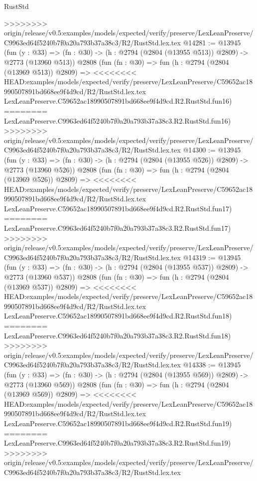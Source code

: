 \begin{lexlean}{RustStd}
\begin{coremodule}
{\begin{coremodule}
{{{{{{{{{{{{{{{{{{{{{{{{{{>>>>>>>> origin/release/v0.5:examples/models/expected/verify/preserve/LexLeanPreserve/C9963ed64f5240b7f0a20a793b37a38c3/R2/RustStd.lex.tex
@14281 := @13945
    (fun (y : @33) => (fn : @30) -> (h : @2794 (@2804 (@13955 @513)) @2809) -> @2773 (@13960 @513))
    @2808
    (fun (fn : @30) =>
    fun (h : @2794 (@2804 (@13969 @513)) @2809) =>
<<<<<<<< HEAD:examples/models/expected/verify/preserve/LexLeanPreserve/C59652ac18990507891bd668ee9f4d9cd/R2/RustStd.lex.tex
    LexLeanPreserve.C59652ac18990507891bd668ee9f4d9cd.R2.RustStd.fun16)
========
    LexLeanPreserve.C9963ed64f5240b7f0a20a793b37a38c3.R2.RustStd.fun16)
>>>>>>>> origin/release/v0.5:examples/models/expected/verify/preserve/LexLeanPreserve/C9963ed64f5240b7f0a20a793b37a38c3/R2/RustStd.lex.tex
@14300 := @13945
    (fun (y : @33) => (fn : @30) -> (h : @2794 (@2804 (@13955 @526)) @2809) -> @2773 (@13960 @526))
    @2808
    (fun (fn : @30) =>
    fun (h : @2794 (@2804 (@13969 @526)) @2809) =>
<<<<<<<< HEAD:examples/models/expected/verify/preserve/LexLeanPreserve/C59652ac18990507891bd668ee9f4d9cd/R2/RustStd.lex.tex
    LexLeanPreserve.C59652ac18990507891bd668ee9f4d9cd.R2.RustStd.fun17)
========
    LexLeanPreserve.C9963ed64f5240b7f0a20a793b37a38c3.R2.RustStd.fun17)
>>>>>>>> origin/release/v0.5:examples/models/expected/verify/preserve/LexLeanPreserve/C9963ed64f5240b7f0a20a793b37a38c3/R2/RustStd.lex.tex
@14319 := @13945
    (fun (y : @33) => (fn : @30) -> (h : @2794 (@2804 (@13955 @537)) @2809) -> @2773 (@13960 @537))
    @2808
    (fun (fn : @30) =>
    fun (h : @2794 (@2804 (@13969 @537)) @2809) =>
<<<<<<<< HEAD:examples/models/expected/verify/preserve/LexLeanPreserve/C59652ac18990507891bd668ee9f4d9cd/R2/RustStd.lex.tex
    LexLeanPreserve.C59652ac18990507891bd668ee9f4d9cd.R2.RustStd.fun18)
========
    LexLeanPreserve.C9963ed64f5240b7f0a20a793b37a38c3.R2.RustStd.fun18)
>>>>>>>> origin/release/v0.5:examples/models/expected/verify/preserve/LexLeanPreserve/C9963ed64f5240b7f0a20a793b37a38c3/R2/RustStd.lex.tex
@14338 := @13945
    (fun (y : @33) => (fn : @30) -> (h : @2794 (@2804 (@13955 @569)) @2809) -> @2773 (@13960 @569))
    @2808
    (fun (fn : @30) =>
    fun (h : @2794 (@2804 (@13969 @569)) @2809) =>
<<<<<<<< HEAD:examples/models/expected/verify/preserve/LexLeanPreserve/C59652ac18990507891bd668ee9f4d9cd/R2/RustStd.lex.tex
    LexLeanPreserve.C59652ac18990507891bd668ee9f4d9cd.R2.RustStd.fun19)
========
    LexLeanPreserve.C9963ed64f5240b7f0a20a793b37a38c3.R2.RustStd.fun19)
>>>>>>>> origin/release/v0.5:examples/models/expected/verify/preserve/LexLeanPreserve/C9963ed64f5240b7f0a20a793b37a38c3/R2/RustStd.lex.tex
}}}}}}}}}}}}}}}}}}}}}}}}}}
\end{coremodule}}
\end{coremodule}
\end{lexlean}
